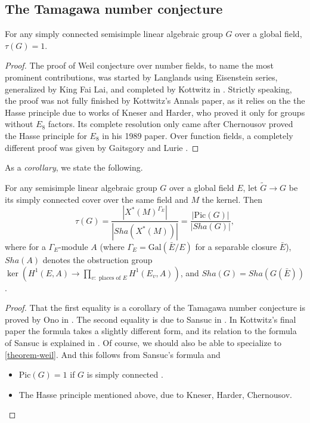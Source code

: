 	
	
\subsection{The Tamagawa number conjecture}
\label{subsection-Tamagawa-conjecture}
	\begin{theorem}
		\label{theorem-weil}
		For any simply connected semisimple linear algebraic group $G$ over a global field, $\tau(G)=1$.
	\end{theorem}

\begin{proof}
	The proof of Weil conjecture over number fields, to name the most prominent contributions, was started by Langlands using Eisenstein series, generalized by King Fai Lai, and completed by Kottwitz in \cite{Kottwitz-Tamagawa}. Strictly speaking, the proof was not fully finished by Kottwitz's Annals paper, as it relies on the the Hasse principle due to works of Kneser and Harder, who proved it only for groups without $E_8$ factors. Its complete resolution only came after Chernousov proved the Hasse principle for $E_8$ in his 1989 paper. Over function fields, a completely different proof was given by Gaitsgory and Lurie \cite{Gaitsgory-Lurie}. 
\end{proof}
	
	
	As a \emph{corollary}, we state the following.
	
\begin{theorem}
		\label{theorem-general-weil}
		For any semisimple linear algebraic group $G$ over a global field $E$, let $\tilde{G}\to G$ be its simply connected cover over the same field and $M$ the kernel. Then
		\[\tau(G) = \frac{|X^*(M)^{\Gamma_E}|}{|Sha(X^*(M))|} = \frac{|\mathrm{Pic}(G)|}{|Sha(G)|},\]
		where for a $\Gamma_E$-module $A$ (where $\Gamma_E = \text{Gal}(\bar E/E)$ for a separable closure $\bar E$), $Sha(A)$ denotes the obstruction group $\ker(H^1(E,A)\to 
		\prod_{v:\text{ places of }E} H^1(E_v,A))$, and $Sha(G) = Sha(G(\bar E))$.
\end{theorem}

\begin{proof}
		That the first equality is a corollary of the Tamagawa number conjecture is proved by Ono in \cite{Ono-relative-Tamagawa}. The second equality is due to Sansuc in \cite{Sansuc-Brauer}. In Kottwitz's final paper \cite{Kottwitz-Tamagawa} the formula takes a slightly different form, and its relation to the formula of Sansuc is explained in \cite{Kottwitz-cuspidal-tempered}. Of course, we should also be able to specialize to \ref{theorem-weil}. And this follows from Sansuc's formula and
		\begin{itemize}
			\item $\mathrm{Pic}(G)=1$ if $G$ is simply connected \cite[Cor.~18.24]{Milne-algebraic-groups}.
			\item The Hasse principle mentioned above, due to Kneser, Harder, Chernousov.
		\end{itemize}
\end{proof}
	

